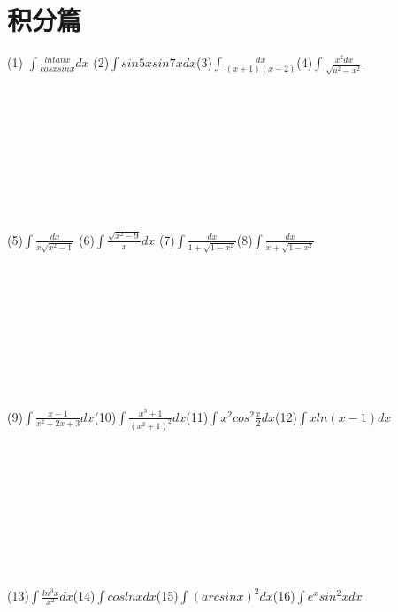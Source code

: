\documentclass[UTF8]{ctexart}
\begin{document}
  \vspace{-8mm} \section{积分篇}
  (1) $\displaystyle{\int \frac{lntanx}{cosxsinx}dx}$ \quad\quad\quad(2)$\displaystyle{\int sin5xsin7xdx}$\quad\quad\quad (3)$\displaystyle{\int \frac{dx}{(x+1)(x-2)}}$\quad\quad(4)$\displaystyle{\int \frac{x^2dx}{\sqrt{a^2-x^2}}}$
  \\ \\ \\ \\ \\ \\ \\ \\ \\ \\
  \quad \quad \quad \quad(5)$\displaystyle{\int \frac{dx}{x\sqrt{x^2-1}}}$ \quad\quad\quad (6)$\displaystyle{\int \frac{\sqrt{x^2-9}}{x}dx}$
  \quad\quad\quad(7)$\displaystyle{\int \frac{dx}{1+\sqrt{1-x^2}}}$\quad\quad(8)$\displaystyle{\int \frac{dx}{x+\sqrt{1-x^2}}}$
   \\ \\ \\ \\ \\ \\ \\ \\ \\ \\
   (9)$\displaystyle{\int \frac{x-1}{x^2+2x+3}dx}$\quad\quad\quad (10)$\displaystyle{\int \frac{x^3+1}{(x^2+1)^2}dx}$\quad\quad\quad(11)$\displaystyle{\int x^2cos^2\frac{x}{2}dx}$\quad\quad\quad(12)$\displaystyle{\int xln(x-1)dx}$
   \\ \\ \\ \\ \\ \\ \\ \\ \\ \\
   (13)$\displaystyle{\int \frac{ln^3x}{x^2}dx}$\quad\quad\quad(14)$\displaystyle{\int coslnxdx}$\quad\quad\quad(15)$\displaystyle{\int (arcsinx)^2dx}$\quad\quad\quad(16)$\displaystyle{\int e^xsin^2xdx}$
   \\ \\ \\ \\ \\ \\ \\ \\ \\ \\ \\ \\ \\
\end{document}
